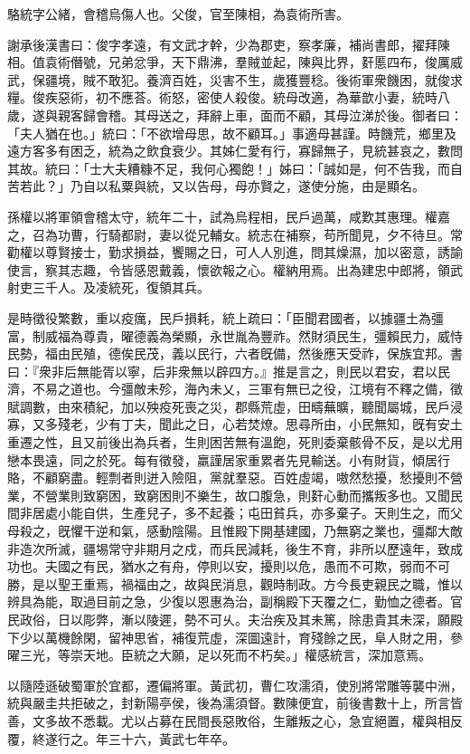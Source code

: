 
\begin{pinyinscope}
駱統字公緒，會稽烏傷人也。父俊，官至陳相，為袁術所害。

謝承後漢書曰：俊字孝遠，有文武才幹，少為郡吏，察孝廉，補尚書郎，擢拜陳相。值袁術僭號，兄弟忿爭，天下鼎沸，羣賊並起，陳與比界，姧慝四布，俊厲威武，保疆境，賊不敢犯。養濟百姓，災害不生，歲獲豐稔。後術軍衆饑困，就俊求糧。俊疾惡術，初不應荅。術怒，密使人殺俊。統母改適，為華歆小妻，統時八歲，遂與親客歸會稽。其母送之，拜辭上車，面而不顧，其母泣涕於後。御者曰：「夫人猶在也。」統曰：「不欲增母思，故不顧耳。」事適母甚謹。時饑荒，鄉里及遠方客多有困乏，統為之飲食衰少。其姊仁愛有行，寡歸無子，見統甚哀之，數問其故。統曰：「士大夫糟糠不足，我何心獨飽！」姊曰：「誠如是，何不告我，而自苦若此？」乃自以私粟與統，又以告母，母亦賢之，遂使分施，由是顯名。

孫權以將軍領會稽太守，統年二十，試為烏程相，民戶過萬，咸歎其惠理。權嘉之，召為功曹，行騎都尉，妻以從兄輔女。統志在補察，苟所聞見，夕不待旦。常勸權以尊賢接士，勤求損益，饗賜之日，可人人別進，問其燥濕，加以密意，誘諭使言，察其志趣，令皆感恩戴義，懷欲報之心。權納用焉。出為建忠中郎將，領武射吏三千人。及凌統死，復領其兵。

是時徵役繁數，重以疫癘，民戶損耗，統上疏曰：「臣聞君國者，以據疆土為彊富，制威福為尊貴，曜德義為榮顯，永世胤為豐祚。然財須民生，彊賴民力，威恃民勢，福由民殖，德俟民茂，義以民行，六者旣備，然後應天受祚，保族宜邦。書曰：『衆非后無能胥以寧，后非衆無以辟四方。』推是言之，則民以君安，君以民濟，不易之道也。今彊敵未殄，海內未乂，三軍有無已之役，江境有不釋之備，徵賦調數，由來積紀，加以殃疫死喪之災，郡縣荒虛，田疇蕪曠，聽聞屬城，民戶浸寡，又多殘老，少有丁夫，聞此之日，心若焚燎。思尋所由，小民無知，旣有安土重遷之性，且又前後出為兵者，生則困苦無有溫飽，死則委棄骸骨不反，是以尤用戀本畏遠，同之於死。每有徵發，羸謹居家重累者先見輸送。小有財貨，傾居行賂，不顧窮盡。輕剽者則迸入險阻，黨就羣惡。百姓虛竭，嗷然愁擾，愁擾則不營業，不營業則致窮困，致窮困則不樂生，故口腹急，則姧心動而攜叛多也。又聞民間非居處小能自供，生產兒子，多不起養；屯田貧兵，亦多棄子。天則生之，而父母殺之，旣懼干逆和氣，感動陰陽。且惟殿下開基建國，乃無窮之業也，彊鄰大敵非造次所滅，疆埸常守非期月之戍，而兵民減耗，後生不育，非所以歷遠年，致成功也。夫國之有民，猶水之有舟，停則以安，擾則以危，愚而不可欺，弱而不可勝，是以聖王重焉，禍福由之，故與民消息，觀時制政。方今長吏親民之職，惟以辨具為能，取過目前之急，少復以恩惠為治，副稱殿下天覆之仁，勤恤之德者。官民政俗，日以彫弊，漸以陵遲，勢不可乆。夫治疾及其未篤，除患貴其未深，願殿下少以萬機餘閑，留神思省，補復荒虛，深圖遠計，育殘餘之民，阜人財之用，參曜三光，等崇天地。臣統之大願，足以死而不朽矣。」權感統言，深加意焉。

以隨陸遜破蜀軍於宜都，遷偏將軍。黃武初，曹仁攻濡須，使別將常雕等襲中洲，統與嚴圭共拒破之，封新陽亭侯，後為濡須督。數陳便宜，前後書數十上，所言皆善，文多故不悉載。尤以占募在民間長惡敗俗，生離叛之心，急宜絕置，權與相反覆，終遂行之。年三十六，黃武七年卒。


\end{pinyinscope}